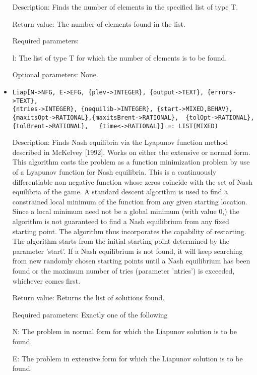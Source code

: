 \begin{itemize}
\bd
\item
[Description:] Finds the number of elements in the specified list of
type T.
\item
[Return value:] The number of elements found in the list.
\item
[Required parameters:]\hfil\null

\bd
\item
[l:] The list of type T for which the number of elements is to be
found.
\ed

\item
[Optional parameters:] None.
\ed

\item
\protect \large \begin{verbatim}
Liap[N->NFG, E->EFG, {plev->INTEGER}, {output->TEXT}, {errors->TEXT},
{ntries->INTEGER}, {nequilib->INTEGER}, {start->MIXED,BEHAV},
{maxitsOpt->RATIONAL},{maxitsBrent->RATIONAL}, 	{tolOpt->RATIONAL},
{tolBrent->RATIONAL}, 	{time<->RATIONAL}] =: LIST(MIXED)
\end{verbatim}\normalsize

\bd
\item
[Description:] Finds Nash equilibria via the Lyapunov function method
described in McKelvey [1992].  Works on either the extensive or normal
form.  This algorithm casts the problem as a function minimization
problem by use of a Lyapunov function for Nash equilibria.  This is a
continuously differentiable non negative function whose zeros coincide
with the set of Nash equilibria of the game.  A standard descent
algorithm is used to find a constrained local minimum of the function
from any given starting location.  Since a local minimum need not be a
global minimum (with value 0,) the algorithm is not guaranteed to find
a Nash equilibrium from any fixed starting point.  The algorithm thus
incorporates the capability of restarting.  The algorithm starts from
the initial starting point determined by the parameter 'start'.  If a
Nash equilibrium is not found, it will keep searching from new
randomly chosen starting points until a Nash equilibrium has been
found or the maximum number of tries (parameter 'ntries') is exceeded,
whichever comes first.
\item
[Return value:] Returns the list of solutions found.
\item
[Required parameters:] Exactly one of the following \hfil\null

\bd
\item
[N:] The problem in normal form for which the Liapunov solution is to
be found.
\item
[E:] The problem in extensive form for which the Liapunov solution is
to be found.
\ed


\end{itemize}
